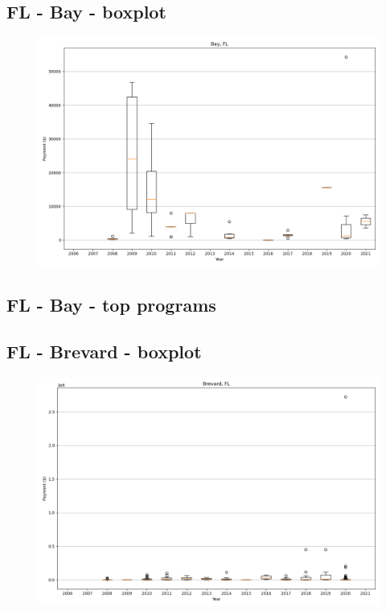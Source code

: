 \subsection*{FL - Bay - boxplot}
\begin{figure}[h]
\centering
\includegraphics[width=7in]{../output/boxplots/counties/Bay-FL_boxplot.png}
\end{figure}


\subsection*{FL - Bay - top programs}

\newpage
\subsection*{FL - Brevard - boxplot}
\begin{figure}[h]
\centering
\includegraphics[width=7in]{../output/boxplots/counties/Brevard-FL_boxplot.png}
\end{figure}


